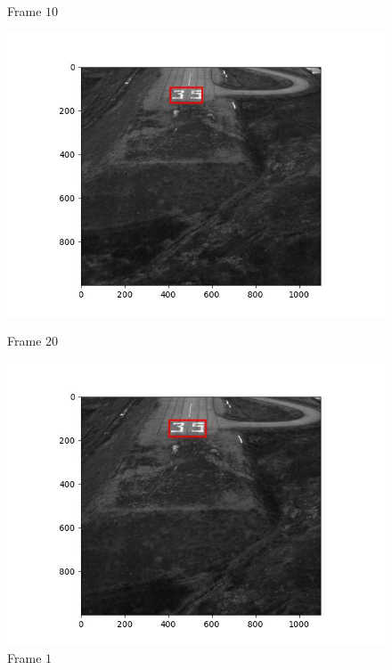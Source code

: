 \begin{figure}[H]
\begin{minipage}{.49\textwidth}
    \caption{Frame $10$}
  \end{minipage}
  \hfill
  \begin{minipage}{.49\textwidth}
    \centering
    \includegraphics[width=\textwidth]{./figures/lk_affine/landing/frame000020.jpg}
    \caption{Frame $20$}
  \end{minipage}
  \begin{minipage}{.49\textwidth}
    \centering
    \includegraphics[width=\textwidth]{./figures/lk_affine/landing/frame000030.jpg}
    \caption{Frame $1$}
  \end{minipage}
  \hfill
  \begin{minipage}{.49\textwidth}
    \centering

\end{minipage}
\end{figure}
